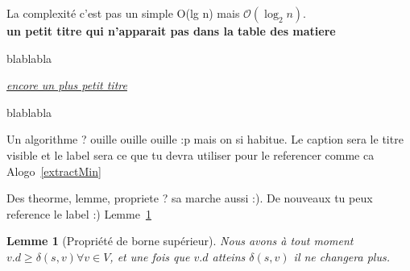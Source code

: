\documentclass[12pt,a4paper,final]{article}
\newcommand{\smalltitle}[1]{\bigskip\large\textbf{#1}\par\normalsize\medskip}
\newcommand{\partitle}[1]{\bigskip\textit{\underline{#1}}\par\medskip}
\newtheorem{lemme}{Lemme}
\begin{document}
La complexité c'est pas un simple O(lg n) mais $\mathcal{O}(\log_2 n)$.\\

\smalltitle{un petit titre qui n'apparait pas dans la table des matiere}
blablabla

\partitle{encore un plus petit titre}
blablabla

Un algorithme ? ouille ouille ouille :p mais on si habitue. Le caption sera le titre visible et le label sera ce que tu devra utiliser pour le referencer comme ca Alogo~\ref{extractMin}




Des theorme, lemme, propriete ? sa marche aussi :). De nouveaux tu peux reference le label :) Lemme~\ref{upper-bound_prop}

\begin{lemme}[Propriété de borne supérieur]\label{upper-bound_prop}
Nous avons à tout moment $v.d \geq \delta(s,v) \forall v \in V$, et une fois que $v.d$ atteins $\delta(s,v)$ il ne changera plus.
\end{lemme}
\end{document}
